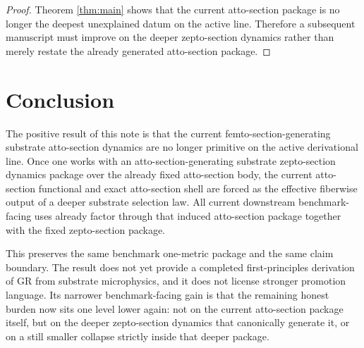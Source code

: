 \documentclass[11pt]{article}
\begin{document}
\begin{proof}
Theorem \ref{thm:main} shows that the current atto-section package is no longer the deepest unexplained datum on the active line. Therefore a subsequent manuscript must improve on the deeper zepto-section dynamics rather than merely restate the already generated atto-section package.
\end{proof}

\section{Conclusion}

The positive result of this note is that the current femto-section-generating substrate atto-section dynamics are no longer primitive on the active derivational line. Once one works with an atto-section-generating substrate zepto-section dynamics package over the already fixed atto-section body, the current atto-section functional and exact atto-section shell are forced as the effective fiberwise output of a deeper substrate selection law. All current downstream benchmark-facing uses already factor through that induced atto-section package together with the fixed zepto-section package.

This preserves the same benchmark one-metric package and the same claim boundary. The result does not yet provide a completed first-principles derivation of GR from substrate microphysics, and it does not license stronger promotion language. Its narrower benchmark-facing gain is that the remaining honest burden now sits one level lower again: not on the current atto-section package itself, but on the deeper zepto-section dynamics that canonically generate it, or on a still smaller collapse strictly inside that deeper package.
\end{document}
